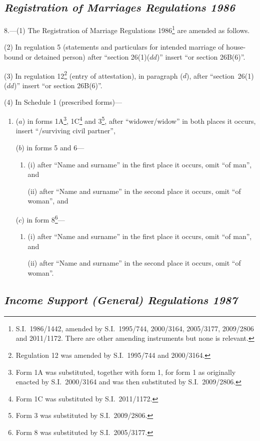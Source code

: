\documentclass[12pt,a4paper]{article}
\begin{document}
\subsection*{\itshape Registration of Marriages Regulations 1986}

8.—(1) The Registration of Marriage Regulations 1986\footnote{S.I.~1986/1442, amended by S.I.~1995/744, 2000/3164, 2005/3177, 2009/2806 and 2011/1172. There are other amending instruments but none is relevant.} are amended as follows.

(2) In regulation 5 (statements and particulars for intended marriage of house-bound or detained person) after “section 26(1)($dd$)” insert “or section 26B(6)”.

(3) In regulation 12\footnote{Regulation 12 was amended by S.I.~1995/744 and 2000/3164.} (entry of attestation), in paragraph ($d$), after “section~26(1)($dd$)” insert “or section 26B(6)”.

(4) In Schedule 1 (prescribed forms)—
\begin{enumerate}\item[]
($a$) in forms 1A\footnote{Form 1A was substituted, together with form 1, for form 1 as originally enacted by S.I.~2000/3164 and was then substituted by S.I.~2009/2806.}, 1C\footnote{Form 1C was substituted by S.I.~2011/1172.} and 3\footnote{Form 3 was substituted by S.I.~2009/2806.}, after “widower/widow” in both places it occurs, insert “/surviving civil partner”,

($b$) in forms 5 and 6—
\begin{enumerate}\item[]
(i) after “Name and surname” in the first place it occurs, omit “of man”, and

(ii) after “Name and surname” in the second place it occurs, omit “of woman”, and
\end{enumerate}

($c$) in form 8\footnote{Form 8 was substituted by S.I.~2005/3177.}—
\begin{enumerate}\item[]
(i) after “Name and surname” in the first place it occurs, omit “of man”, and

(ii) after “Name and surname” in the second place it occurs, omit “of woman”.
\end{enumerate}
\end{enumerate}

\subsection*{\itshape Income Support (General) Regulations 1987}
\end{document}

